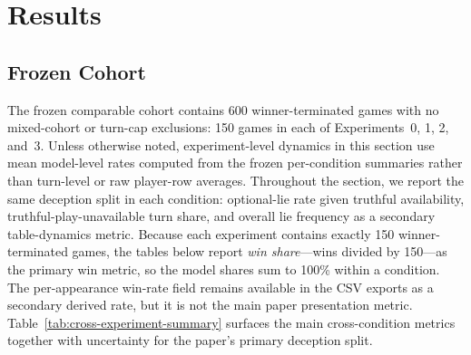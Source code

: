 \section{Results}

\subsection{Frozen Cohort}

The frozen comparable cohort contains 600 winner-terminated games with no mixed-cohort or turn-cap exclusions: 150 games in each of Experiments~0, 1, 2, and~3. Unless otherwise noted, experiment-level dynamics in this section use mean model-level rates computed from the frozen per-condition summaries rather than turn-level or raw player-row averages. Throughout the section, we report the same deception split in each condition: optional-lie rate given truthful availability, truthful-play-unavailable turn share, and overall lie frequency as a secondary table-dynamics metric. Because each experiment contains exactly 150 winner-terminated games, the tables below report \emph{win share}---wins divided by 150---as the primary win metric, so the model shares sum to 100\% within a condition. The per-appearance win-rate field remains available in the CSV exports as a secondary derived rate, but it is not the main paper presentation metric. Table~\ref{tab:cross-experiment-summary} surfaces the main cross-condition metrics together with uncertainty for the paper's primary deception split.

\begin{table}[t]
  \centering
  \scriptsize
  \caption{Cross-experiment summary for the frozen cohort. Optional-lie rate, lie success, challenge frequency, challenge accuracy, and conflict-turn share are mean model-level rates with bootstrap 95\% confidence intervals.}
  \label{tab:cross-experiment-summary}
\end{table}


